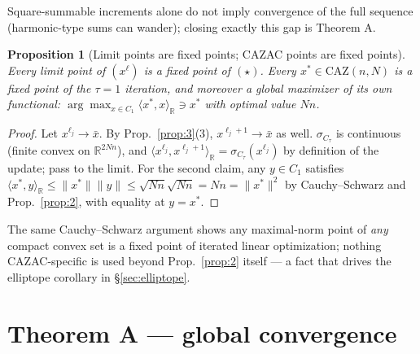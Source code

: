 \documentclass[11pt]{article}
\theoremstyle{plain}
\newtheorem{proposition}[theorem]{Proposition}
\theoremstyle{definition}
\theoremstyle{remark}
\newcommand{\R}{\mathbb R}
\newcommand{\CAZ}{\mathrm{CAZ}}
\begin{document}
Square-summable increments alone do not imply convergence of the full
sequence (harmonic-type sums can wander); closing exactly this gap is
Theorem A.

\begin{proposition}[Limit points are fixed points; CAZAC points are fixed points]\label{prop:4}
Every limit point of $(x^\ell)$ is a fixed point of $(\star)$. Every
$x^*\in\CAZ(n,N)$ is a fixed point of the $\tau=1$ iteration, and moreover
a global maximizer of its own functional:
$\arg\max_{x\in C_1}\langle x^*,x\rangle_\R\ni x^*$ with optimal value $Nn$.
\end{proposition}
\begin{proof}
Let $x^{\ell_j}\to\bar x$. By Prop.~\ref{prop:3}(3), $x^{\ell_j+1}\to\bar x$
as well. $\sigma_{C_\tau}$ is continuous (finite convex on $\R^{2Nn}$), and
$\langle x^{\ell_j},x^{\ell_j+1}\rangle_\R=\sigma_{C_\tau}(x^{\ell_j})$ by
definition of the update; pass to the limit. For the second claim, any
$y\in C_1$ satisfies $\langle x^*,y\rangle_\R\le\|x^*\|\|y\|\le\sqrt{Nn}\sqrt{Nn}=Nn=\|x^*\|^2$
by Cauchy--Schwarz and Prop.~\ref{prop:2}, with equality at $y=x^*$.
\end{proof}

The same Cauchy--Schwarz argument shows any maximal-norm point of \emph{any}
compact convex set is a fixed point of iterated linear optimization;
nothing CAZAC-specific is used beyond Prop.~\ref{prop:2} itself --- a fact
that drives the elliptope corollary in \S\ref{sec:elliptope}.

\section{Theorem A --- global convergence}
\end{document}
